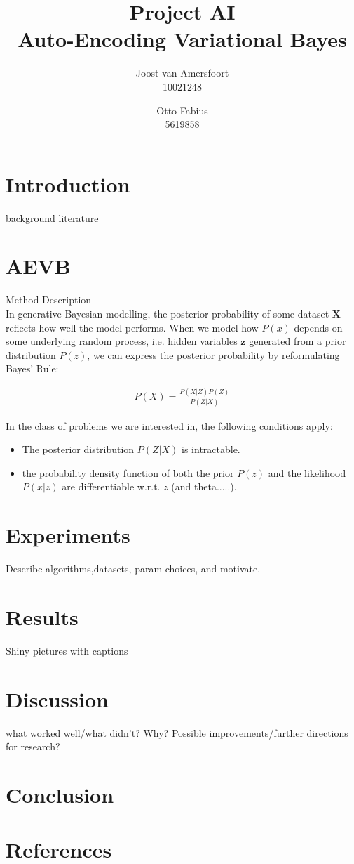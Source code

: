 \documentclass{article}
\begin{document}
\title{Project AI \\ Auto-Encoding Variational Bayes}
\author{	
	Joost van Amersfoort \\ 10021248  
	\and
	Otto Fabius \\ 5619858
	}
\maketitle

\section*{Introduction}
background literature \\ 



\section*{AEVB}
Method Description \\

In generative Bayesian modelling, the posterior probability of some dataset $\mathbf{X}$ reflects how well the model performs. When we model how $P(x)$ depends on some underlying random process, i.e. hidden variables $\mathbf{z}$ generated from a prior distribution $P(z)$, we can express the posterior probability by reformulating Bayes' Rule:

\begin{align*}
P(X) = \frac{P(X|Z)P(Z)}{P(Z|X)}
\end{align*}

In the class of problems we are interested in, the following conditions apply:
\begin{itemize}
\item The posterior distribution $P(Z|X)$ is intractable. 
\item the probability density function of both the prior $P(z)$ and the likelihood $P(x|z)$ are differentiable w.r.t. $z$ (and theta.....). 
\end{itemize}

\section*{Experiments}

Describe algorithms,datasets, param choices, and motivate.

\section*{Results}

Shiny pictures with captions

\section*{Discussion}

what worked well/what didn't? Why? Possible improvements/further directions for research?

\section*{Conclusion}



\section*{References}
\end{document}

